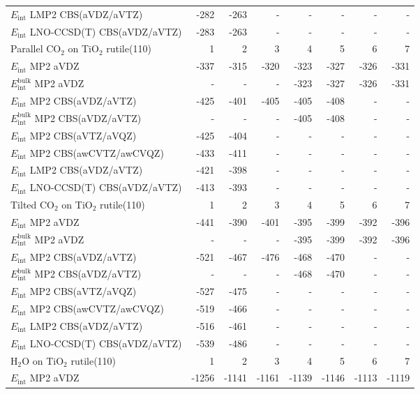 \begin{longtable}{lrrrrrrr}
$E_\textrm{int}$ LMP2 CBS(aVDZ/aVTZ) & -282 & -263 & - & - & - & - & - \\
$E_\textrm{int}$ LNO-CCSD(T) CBS(aVDZ/aVTZ) & -283 & -263 & - & - & - & - & - \\
\toprule
Parallel CO$_2$ on TiO$_2$ rutile(110) & 1 & 2 & 3 & 4 & 5 & 6 & 7 \\ 
\midrule
$E_\textrm{int}$ MP2 aVDZ & -337 & -315 & -320 & -323 & -327 & -326 & -331 \\
$E_\textrm{int}^\textrm{bulk}$ MP2 aVDZ & - & - & - & -323 & -327 & -326 & -331 \\
$E_\textrm{int}$ MP2 CBS(aVDZ/aVTZ) & -425 & -401 & -405 & -405 & -408 & - & - \\
$E_\textrm{int}^\textrm{bulk}$ MP2 CBS(aVDZ/aVTZ) & - & - & - & -405 & -408 & - & - \\
$E_\textrm{int}$ MP2 CBS(aVTZ/aVQZ) & -425 & -404 & - & - & - & - & - \\
$E_\textrm{int}$ MP2 CBS(awCVTZ/awCVQZ) & -433 & -411 & - & - & - & - & - \\
$E_\textrm{int}$ LMP2 CBS(aVDZ/aVTZ) & -421 & -398 & - & - & - & - & - \\
$E_\textrm{int}$ LNO-CCSD(T) CBS(aVDZ/aVTZ) & -413 & -393 & - & - & - & - & - \\
\toprule
Tilted CO$_2$ on TiO$_2$ rutile(110) & 1 & 2 & 3 & 4 & 5 & 6 & 7 \\ 
\midrule
$E_\textrm{int}$ MP2 aVDZ & -441 & -390 & -401 & -395 & -399 & -392 & -396 \\
$E_\textrm{int}^\textrm{bulk}$ MP2 aVDZ & - & - & - & -395 & -399 & -392 & -396 \\
$E_\textrm{int}$ MP2 CBS(aVDZ/aVTZ) & -521 & -467 & -476 & -468 & -470 & - & - \\
$E_\textrm{int}^\textrm{bulk}$ MP2 CBS(aVDZ/aVTZ) & - & - & - & -468 & -470 & - & - \\
$E_\textrm{int}$ MP2 CBS(aVTZ/aVQZ) & -527 & -475 & - & - & - & - & - \\
$E_\textrm{int}$ MP2 CBS(awCVTZ/awCVQZ) & -519 & -466 & - & - & - & - & - \\
$E_\textrm{int}$ LMP2 CBS(aVDZ/aVTZ) & -516 & -461 & - & - & - & - & - \\
$E_\textrm{int}$ LNO-CCSD(T) CBS(aVDZ/aVTZ) & -539 & -486 & - & - & - & - & - \\
\toprule
H$_2$O on TiO$_2$ rutile(110) & 1 & 2 & 3 & 4 & 5 & 6 & 7 \\ 
\midrule
$E_\textrm{int}$ MP2 aVDZ & -1256 & -1141 & -1161 & -1139 & -1146 & -1113 & -1119 \\

\end{longtable}
